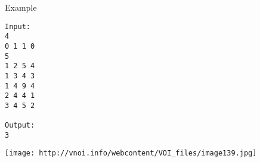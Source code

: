 Example
\begin{verbatim}
Input:
4
0 1 1 0
5
1 2 5 4
1 3 4 3
1 4 9 4
2 4 4 1
3 4 5 2

Output:
3

\end{verbatim}


\texttt{[image: http://vnoi.info/webcontent/VOI\_files/image139.jpg]}